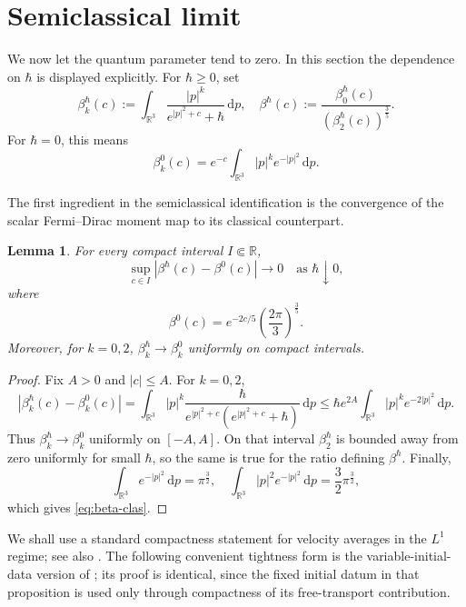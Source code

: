 \documentclass[10pt,reqno]{amsart}
\numberwithin{equation}{section}
\newtheorem{lemma}{Lemma}[section]
\theoremstyle{definition}
\newcommand{\R}{\mathbb R}
\newcommand{\dpp}{\mathrm{d}p}
\newcommand{\bq}{\begin{equation}}
\newcommand{\eq}{\end{equation}}
\newcommand{\lt}{\left}
\newcommand{\rt}{\right}
\begin{document}
 


%
%
%
%
%
%
\section{Semiclassical limit}\label{sec:semiclas}

We now let the quantum parameter tend to zero. In this section the dependence on $\hbar$ is displayed explicitly.  For $\hbar\geq0$, set
\[
 \beta_{k}^{\hbar}(c)  :=\int_{\R^3}\frac{|p|^k}{e^{|p|^2+c}+\hbar}\,\dpp,  \quad  \beta^{\hbar}(c)  :=\frac{\beta_0^{\hbar}(c)}{(\beta_2^{\hbar}(c))^{\frac35}}.
\]
For $\hbar=0$, this means
\[
 \beta_k^0(c)=e^{-c}\int_{\R^3}|p|^ke^{-|p|^2}\,\dpp.
\]

The first ingredient in the semiclassical identification is the convergence of the scalar Fermi--Dirac moment map to its classical counterpart.

\begin{lemma}\label{lem:beta-semic}
For every compact interval $I\Subset\R$,
\[
 \sup_{c\in I}|\beta^{\hbar}(c)-\beta^0(c)|\to0  \quad\text{as }\hbar\downarrow0,
\]
where
\bq \label{eq:beta-clas}
 \beta^0(c)  =e^{-2c/5}\lt(\frac{2\pi}{3}\rt)^{\frac35}.
\eq
Moreover, for $k=0,2$, $\beta_k^{\hbar}\to\beta_k^0$ uniformly on compact intervals.
\end{lemma}

\begin{proof}
Fix $A>0$ and $|c|\leq A$.  For $k=0,2$,
\[
 |\beta_k^{\hbar}(c)-\beta_k^0(c)| =\int_{\R^3} |p|^k\frac{\hbar}{e^{|p|^2+c}(e^{|p|^2+c}+\hbar)}\,\dpp \leq \hbar e^{2A}\int_{\R^3}|p|^ke^{-2|p|^2}\,\dpp.
\]
Thus $\beta_k^{\hbar}\to\beta_k^0$ uniformly on $[-A,A]$.  On that interval $\beta_2^{\hbar}$ is bounded away from zero uniformly for small $\hbar$, so the same is true for the ratio defining $\beta^{\hbar}$.  Finally,
\[
 \int_{\R^3}e^{-|p|^2}\,\dpp=\pi^{\frac32},  \quad  \int_{\R^3}|p|^2e^{-|p|^2}\,\dpp=\frac32\pi^{\frac32},
\]
which gives \eqref{eq:beta-clas}.
\end{proof}

We shall use a standard compactness statement for velocity averages in the $L^1$ regime; see also \cite{GSR02}.  The following convenient tightness form is the variable-initial-data version of \cite[Proposition 4.1]{KS25}; its proof is identical, since the fixed initial datum in that proposition is used only through compactness of its free-transport contribution.
\end{document}
